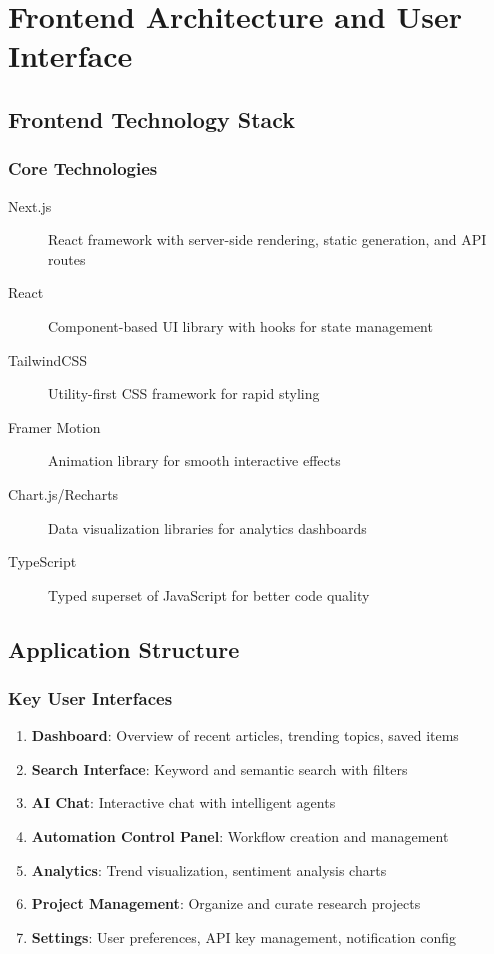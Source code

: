 \documentclass[12pt,a4paper]{report}
\begin{document}
\newpage


\chapter{Frontend Architecture and User Interface}

\section{Frontend Technology Stack}

\subsection{Core Technologies}

\begin{description}
    \item[Next.js] React framework with server-side rendering, static generation, and API routes
    \item[React] Component-based UI library with hooks for state management
    \item[TailwindCSS] Utility-first CSS framework for rapid styling
    \item[Framer Motion] Animation library for smooth interactive effects
    \item[Chart.js/Recharts] Data visualization libraries for analytics dashboards
    \item[TypeScript] Typed superset of JavaScript for better code quality
\end{description}

\section{Application Structure}

\subsection{Key User Interfaces}

\begin{enumerate}
    \item \textbf{Dashboard}: Overview of recent articles, trending topics, saved items
    \item \textbf{Search Interface}: Keyword and semantic search with filters
    \item \textbf{AI Chat}: Interactive chat with intelligent agents
    \item \textbf{Automation Control Panel}: Workflow creation and management
    \item \textbf{Analytics}: Trend visualization, sentiment analysis charts
    \item \textbf{Project Management}: Organize and curate research projects
    \item \textbf{Settings}: User preferences, API key management, notification config
\end{enumerate}
\end{document}
